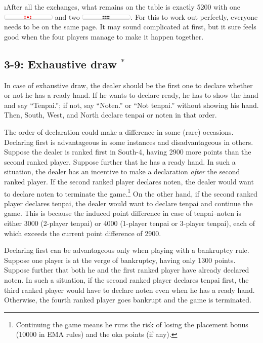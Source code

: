 \i After all the exchanges, what remains on the table is exactly 5200 with one \includegraphics[width=1in]{figs/tenbou5000} and two \includegraphics[width=1in]{figs/tenbou100}.
\ee
For this to work out perfectly, everyone needs to be on the same page. It may sound complicated at first, but it sure feels good when the four players manage to make it happen together.

\subsection*{3-9: Exhaustive draw $^{*}$}
In case of exhaustive draw, the dealer should be the first one to declare whether or not he has a ready hand. If he wants to declare ready, he has to show the hand and say ``{\jap Tenpai}.''; if not, say ``{\jap Noten}.'' or ``Not {\jap tenpai}.'' without showing his hand. Then, South, West, and North declare {\jap tenpai} or {\jap noten} in that order.

\bigskip
The order of declaration could make a difference in some (rare) occasions. Declaring first is advantageous in some instances and disadvantageous in others. Suppose the dealer is ranked first in South-4, having 2900 more points than the second ranked player. Suppose further that he has a ready hand. In such a situation, the dealer has an incentive to make a declaration \emph{after} the second ranked player. If the second ranked player declares {\jap noten}, the dealer would want to declare {\jap noten} to terminate the game.\footnote{Continuing the game means he runs the risk of losing the placement bonus (10000 in EMA rules) and the {\jap oka} points (if any).} On the other hand, if the second ranked player declares {\jap tenpai}, the dealer would want to declare {\jap tenpai} and continue the game. This is because the induced point difference in case of {\jap tenpai}--{\jap noten} is either 3000 (2-player {\jap tenpai}) or 4000 (1-player {\jap tenpai} or 3-player {\jap tenpai}), each of which exceeds the current point difference of 2900.

\bigskip
Declaring first can be advantageous only when playing with a bankruptcy rule. Suppose one player is at the verge of bankruptcy, having only 1300 points. Suppose further that both he and the first ranked player have already declared {\jap noten}.
In such a situation, if the second ranked player declares {\jap tenpai} first, the third ranked player would have to declare {\jap noten} even when he has a ready hand. Otherwise, the fourth ranked player goes bankrupt and the game is terminated.

